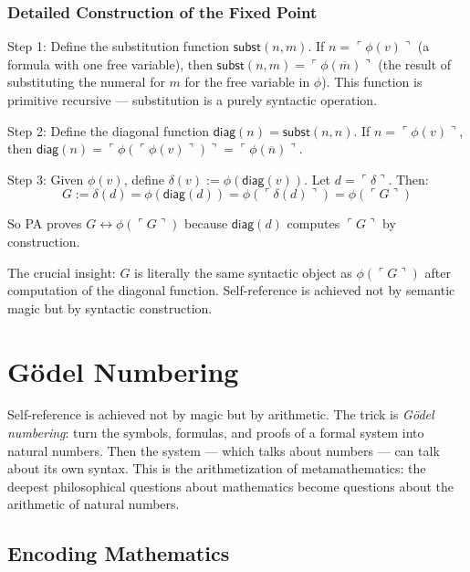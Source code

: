 \subsubsection*{Detailed Construction of the Fixed Point}

Step 1: Define the substitution function $\mathsf{subst}(n, m)$. If $n = \ulcorner \phi(v) \urcorner$ (a formula with one free variable), then $\mathsf{subst}(n, m) = \ulcorner \phi(\overline{m}) \urcorner$ (the result of substituting the numeral for $m$ for the free variable in $\phi$). This function is primitive recursive --- substitution is a purely syntactic operation.

Step 2: Define the diagonal function $\mathsf{diag}(n) = \mathsf{subst}(n, n)$. If $n = \ulcorner \phi(v) \urcorner$, then $\mathsf{diag}(n) = \ulcorner \phi(\ulcorner \phi(v) \urcorner) \urcorner = \ulcorner \phi(\overline{n}) \urcorner$.

Step 3: Given $\phi(v)$, define $\delta(v) := \phi(\mathsf{diag}(v))$. Let $d = \ulcorner \delta \urcorner$. Then:
\[
G := \delta(d) = \phi(\mathsf{diag}(d))
= \phi(\ulcorner \delta(d) \urcorner)
= \phi(\ulcorner G \urcorner)
\]

So PA proves $G \leftrightarrow \phi(\ulcorner G \urcorner)$ because $\mathsf{diag}(d)$ computes $\ulcorner G \urcorner$ by construction.

The crucial insight: $G$ is literally the same syntactic object as $\phi(\ulcorner G \urcorner)$ after computation of the diagonal function. Self-reference is achieved not by semantic magic but by syntactic construction.

\section{Gödel Numbering}
\label{sec:godel:numbering}

Self-reference is achieved not by magic but by arithmetic. The trick is \emph{Gödel numbering}: turn the symbols, formulas, and proofs of a formal system into natural numbers. Then the system --- which talks about numbers --- can talk about its own syntax. This is the arithmetization of metamathematics: the deepest philosophical questions about mathematics become questions about the arithmetic of natural numbers.

\subsection{Encoding Mathematics}
\label{sec:godel:encoding}

